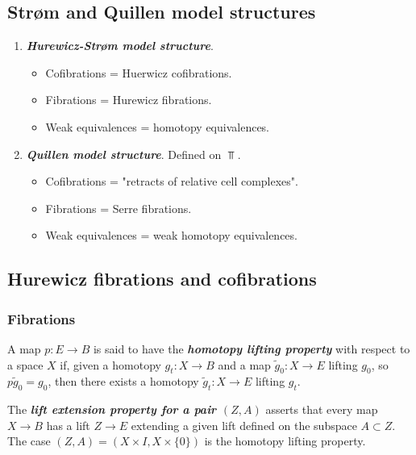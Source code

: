 \begin{remark}
\subsection{Str\o m and Quillen model structures}

\begin{example}\leavevmode
\begin{enumerate}
	\item \textbf{\textit{Hurewicz-Str\o m model structure}}.
	\begin{itemize}
		\item Cofibrations = Huerwicz cofibrations.
		\item Fibrations = Hurewicz fibrations.
		\item Weak equivalences = homotopy equivalences.
	\end{itemize}
	\item \textbf{\textit{Quillen model structure}}. Defined on $\Top$.
	\begin{itemize}
		\item Cofibrations = "retracts of relative cell complexes".
		\item Fibrations = Serre fibrations.
		\item Weak equivalences = weak homotopy equivalences.
	\end{itemize}
\end{enumerate}
\end{example}

\subsection{Hurewicz fibrations and cofibrations}

\subsubsection{Fibrations}

\begin{defn}[Hatcher]
	 A map $p:E\to B$ is said to have the \textbf{\textit{homotopy lifting property}} with respect to a space $X$ if, given a homotopy $g_t:X\to B$ and a map $\tilde{g}_0:X\to E$ lifting $g_0$, so $p\tilde{g}_0=g_0$, then there exists a homotopy $\tilde{g}_t:X\to E$ lifting $g_t$.
	
	The \textbf{\textit{lift extension property for a pair $(Z,A)$}} asserts that every map $X\to B$ has a lift $Z\to E$ extending a given lift defined on the subspace $A\subset Z$. The case $(Z,A)=(X\times I,X\times\{0\})$ is the homotopy lifting property.
	

\end{defn}
\end{remark}
